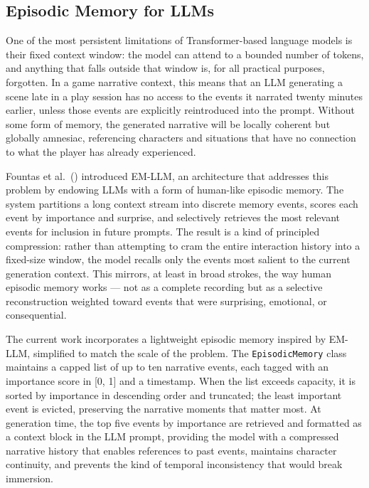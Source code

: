 \subsection{Episodic Memory for LLMs}

One of the most persistent limitations of Transformer-based language models is their fixed context window: the model can attend to a bounded number of tokens, and anything that falls outside that window is, for all practical purposes, forgotten. In a game narrative context, this means that an LLM generating a scene late in a play session has no access to the events it narrated twenty minutes earlier, unless those events are explicitly reintroduced into the prompt. Without some form of memory, the generated narrative will be locally coherent but globally amnesiac, referencing characters and situations that have no connection to what the player has already experienced.

Fountas et al.\ (\citeyear{fountas2024episodic}) introduced EM-LLM, an architecture that addresses this problem by endowing LLMs with a form of human-like episodic memory. The system partitions a long context stream into discrete memory events, scores each event by importance and surprise, and selectively retrieves the most relevant events for inclusion in future prompts. The result is a kind of principled compression: rather than attempting to cram the entire interaction history into a fixed-size window, the model recalls only the events most salient to the current generation context. This mirrors, at least in broad strokes, the way human episodic memory works --- not as a complete recording but as a selective reconstruction weighted toward events that were surprising, emotional, or consequential.

The current work incorporates a lightweight episodic memory inspired by EM-LLM, simplified to match the scale of the problem. The \texttt{EpisodicMemory} class maintains a capped list of up to ten narrative events, each tagged with an importance score in [0, 1] and a timestamp. When the list exceeds capacity, it is sorted by importance in descending order and truncated; the least important event is evicted, preserving the narrative moments that matter most. At generation time, the top five events by importance are retrieved and formatted as a context block in the LLM prompt, providing the model with a compressed narrative history that enables references to past events, maintains character continuity, and prevents the kind of temporal inconsistency that would break immersion.

